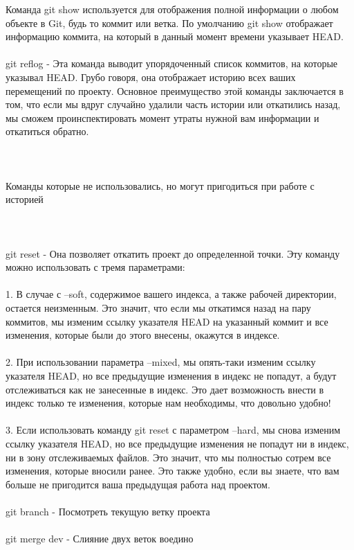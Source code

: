 \documentclass{article}
\begin{document}
\large{Команда git show используется для отображения полной информации о любом объекте в Git, будь то коммит или ветка. По умолчанию git show отображает информацию коммита, на который в данный момент времени указывает HEAD.}
\\ \\
\large{git reflog - Эта команда выводит упорядоченный список коммитов, на которые указывал HEAD. Грубо говоря, она отображает историю всех ваших перемещений по проекту. Основное преимущество этой команды заключается в том, что если мы вдруг случайно удалили часть истории или откатились назад, мы сможем проинспектировать момент утраты нужной вам информации и откатиться обратно.}
\\ \\ \\ \\
\Large{Команды которые не использовались, но могут пригодиться при работе с историей}
\\ \\ \\ \\
\large{git reset -  Она позволяет откатить проект до определенной точки. Эту команду можно использовать с тремя параметрами:}
\\ \\ \large{1. В случае с --soft, содержимое вашего индекса, а также рабочей директории, остается неизменным. Это значит, что если мы откатимся назад на пару коммитов, мы изменим ссылку указателя HEAD на указанный коммит и все изменения, которые были до этого внесены, окажутся в индексе.}
\\ \\ \large{2. При использовании параметра --mixed, мы опять-таки изменим ссылку указателя HEAD, но все предыдущие изменения в индекс не попадут, а будут отслеживаться как не занесенные в индекс. Это дает возможность внести в индекс только те изменения, которые нам необходимы, что довольно удобно!}
\\ \\ \large{3. Если использовать команду git reset с параметром --hard, мы снова изменим ссылку указателя HEAD, но все предыдущие изменения не попадут ни в индекс, ни в зону отслеживаемых файлов. Это значит, что мы полностью сотрем все изменения, которые вносили ранее. Это также удобно, если вы знаете, что вам больше не пригодится ваша предыдущая работа над проектом.}
\\ \\ \large{git branch - Посмотреть текущую ветку проекта}
\\ \\ \large{git merge dev - Слияние двух веток воедино}
\end{document}
